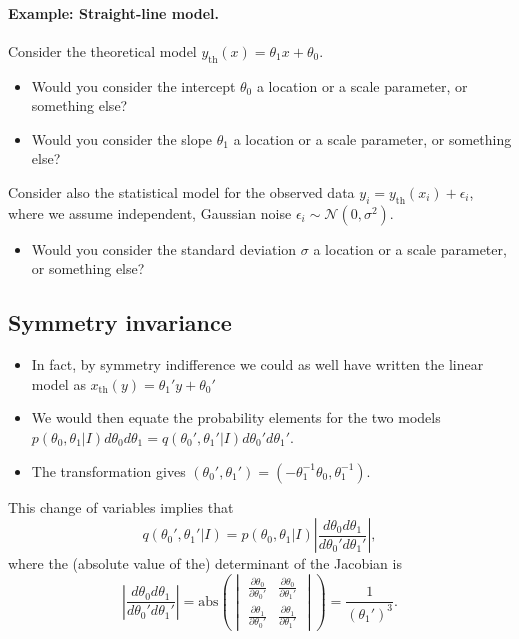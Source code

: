 \documentclass[%
oneside,                 %
final,                   %
10pt]{article}
\begin{document}
\noindent
\paragraph{Example: Straight-line model.}
Consider the theoretical model $y_\mathrm{th}(x) = \theta_1  x  + \theta_0$.

\begin{itemize}
\item Would you consider the intercept $\theta_0$ a location or a scale parameter, or something else?

\item Would you consider the slope $\theta_1$ a location or a scale parameter, or something else?
\end{itemize}

\noindent
Consider also the statistical model for the observed data $y_i = y_\mathrm{th}(x_i) + \epsilon_i$, where we assume independent, Gaussian noise $\epsilon_i \sim \mathcal{N}(0, \sigma^2)$.
\begin{itemize}
\item Would you consider the standard deviation $\sigma$ a location or a scale parameter, or something else?
\end{itemize}

\noindent
\subsection{Symmetry invariance}

\begin{itemize}
\item In fact, by symmetry indifference we could as well have written the linear model as $x_\mathrm{th}(y) = \theta_1'  y  + \theta_0'$

\item We would then equate the probability elements for the two models $p(\theta_0, \theta_1 | I) d\theta_0 d\theta_1 = q(\theta_0', \theta_1' | I) d\theta_0' d\theta_1'$.

\item The transformation gives $(\theta_0', \theta_1') = (-\theta_1^{-1}\theta_0, \theta_1^{-1})$.
\end{itemize}

\noindent
This change of variables implies that
\[
q(\theta_0', \theta_1' | I) = p(\theta_0, \theta_1 | I) \left| \frac{d\theta_0 d\theta_1}{d\theta_0' d\theta_1'} \right|,
\]
where the (absolute value of the) determinant of the Jacobian is
\[
\left| \frac{d\theta_0 d\theta_1}{d\theta_0' d\theta_1'} \right| 
= \mathrm{abs} \left( 
\begin{vmatrix}
\frac{\partial \theta_0}{\partial \theta_0'} & \frac{\partial \theta_0}{\partial \theta_1'} \\
\frac{\partial \theta_1}{\partial \theta_0'} & \frac{\partial \theta_1}{\partial \theta_1'} 
\end{vmatrix}
\right)
= \frac{1}{\left( \theta_1' \right)^3}.
\]
\end{document}
